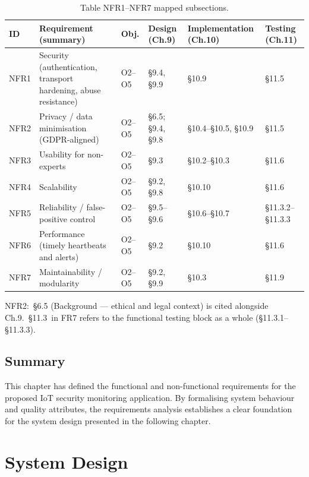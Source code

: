 \begin{table}[htbp]
  \centering
  \small
  \caption{Table  NFR1--NFR7 mapped subsections.}
  \label{tab:ica2_6}
\begin{tabular}{p{}p{}p{}p{}p{}p{}}
\toprule
ID & Requirement (summary) & Obj. & Design (Ch.9) & Implementation (Ch.10) & Testing (Ch.11) \\
\midrule
NFR1 & Security (authentication, transport hardening, abuse resistance) & O2--O5 & \S{}9.4, \S{}9.9 & \S{}10.9 & \S{}11.5 \\
NFR2 & Privacy / data minimisation (GDPR-aligned) & O2--O5 & \S{}6.5; \S{}9.4, \S{}9.8 & \S{}10.4--\S{}10.5, \S{}10.9 & \S{}11.5 \\
NFR3 & Usability for non-experts & O2--O5 & \S{}9.3 & \S{}10.2--\S{}10.3 & \S{}11.6 \\
NFR4 & Scalability & O2--O5 & \S{}9.2, \S{}9.8 & \S{}10.10 & \S{}11.6 \\
NFR5 & Reliability / false-positive control & O2--O5 & \S{}9.5--\S{}9.6 & \S{}10.6--\S{}10.7 & \S{}11.3.2--\S{}11.3.3 \\
NFR6 & Performance (timely heartbeats and alerts) & O2--O5 & \S{}9.2 & \S{}10.10 & \S{}11.6 \\
NFR7 & Maintainability / modularity & O2--O5 & \S{}9.2, \S{}9.9 & \S{}10.3 & \S{}11.9 \\
\bottomrule
\end{tabular}
\end{table}

NFR2:~\S{}6.5 (Background --- ethical and legal context) is cited alongside Ch.9.~\S{}11.3~in FR7 refers to the functional testing block as a whole (\S{}11.3.1--\S{}11.3.3).

\section{Summary}

This chapter has defined the functional and non-functional requirements for the proposed IoT security monitoring application. By formalising system behaviour and quality attributes, the requirements analysis establishes a clear foundation for the system design presented in the following chapter.

\chapter{System Design}

